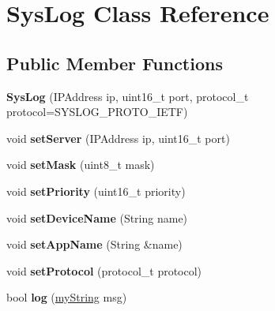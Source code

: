 \hypertarget{class_sys_log}{}\section{Sys\+Log Class Reference}
\label{class_sys_log}
\subsection*{Public Member Functions}
\begin{DoxyCompactItemize}
\item 
\mbox{\label{class_sys_log_a70bf3aae4dc469e141824bdc262df54e}} 
{\bfseries Sys\+Log} (I\+P\+Address ip, uint16\+\_\+t port, protocol\+\_\+t protocol=S\+Y\+S\+L\+O\+G\+\_\+\+P\+R\+O\+T\+O\+\_\+\+I\+E\+TF)
\item 
\mbox{\label{class_sys_log_a070d1987bbdd7ee567e2fe8ca1fd6a2d}} 
void {\bfseries set\+Server} (I\+P\+Address ip, uint16\+\_\+t port)
\item 
\mbox{\label{class_sys_log_ac1f59b46ba6d6ec34c5233ed872d1566}} 
void {\bfseries set\+Mask} (uint8\+\_\+t mask)
\item 
\mbox{\label{class_sys_log_ac7f2e2a2fad50db77251d4c642ba0279}} 
void {\bfseries set\+Priority} (uint16\+\_\+t priority)
\item 
\mbox{\label{class_sys_log_a5255f07122744a41d827b0c5d14aed85}} 
void {\bfseries set\+Device\+Name} (String name)
\item 
\mbox{\label{class_sys_log_a60157e8bd07ef43fb0f75b8816b046b3}} 
void {\bfseries set\+App\+Name} (String \&name)
\item 
\mbox{\label{class_sys_log_a61992419283847b0f4f2e240b6cd72e2}} 
void {\bfseries set\+Protocol} (protocol\+\_\+t protocol)
\item 
\mbox{\label{class_sys_log_a3b245553018d0e04f1943e284beb6a58}} 
bool {\bfseries log} (\hyperlink{class_e_s_p_m_a_n_1_1my_string}{my\+String} msg)
\item 
\mbox{\label{class_sys_log_a567695ffcfc39e65f3c2121949e764d2}} 

\end{DoxyCompactItemize}
